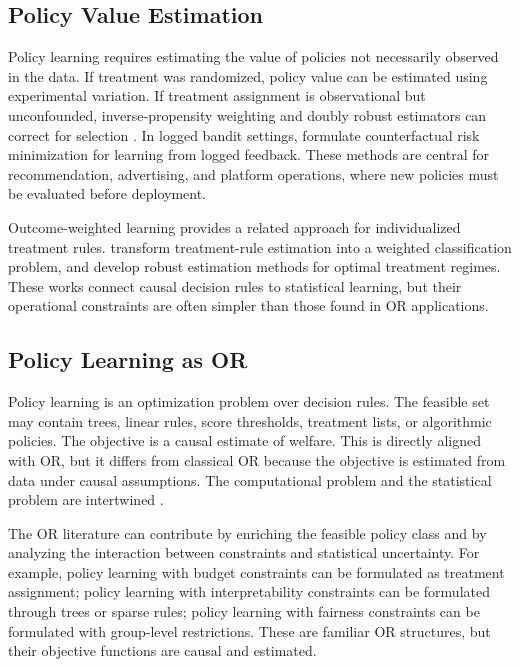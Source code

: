\documentclass[11pt]{article}
\begin{document}
\subsection{Policy Value Estimation}

Policy learning requires estimating the value of policies not necessarily observed in the data. If treatment was randomized, policy value can be estimated using experimental variation. If treatment assignment is observational but unconfounded, inverse-propensity weighting and doubly robust estimators can correct for selection \citep{rosenbaum1983central,dudik2011doubly,athey2021policy}. In logged bandit settings, \citet{swaminathan2015counterfactual} formulate counterfactual risk minimization for learning from logged feedback. These methods are central for recommendation, advertising, and platform operations, where new policies must be evaluated before deployment.

Outcome-weighted learning provides a related approach for individualized treatment rules. \citet{zhao2012owl} transform treatment-rule estimation into a weighted classification problem, and \citet{zhang2012robust} develop robust estimation methods for optimal treatment regimes. These works connect causal decision rules to statistical learning, but their operational constraints are often simpler than those found in OR applications.

\subsection{Policy Learning as OR}

Policy learning is an optimization problem over decision rules. The feasible set may contain trees, linear rules, score thresholds, treatment lists, or algorithmic policies. The objective is a causal estimate of welfare. This is directly aligned with OR, but it differs from classical OR because the objective is estimated from data under causal assumptions. The computational problem and the statistical problem are intertwined \citep{kitagawa2018treated,athey2021policy}.

The OR literature can contribute by enriching the feasible policy class and by analyzing the interaction between constraints and statistical uncertainty. For example, policy learning with budget constraints can be formulated as treatment assignment; policy learning with interpretability constraints can be formulated through trees or sparse rules; policy learning with fairness constraints can be formulated with group-level restrictions. These are familiar OR structures, but their objective functions are causal and estimated.
\end{document}
